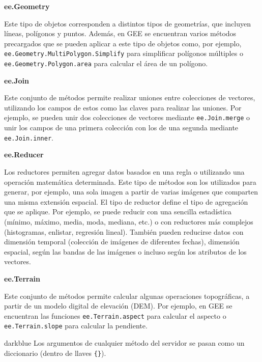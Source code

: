 \documentclass[
  12pt,
  letterpaper,
  twoside]{book}
\begin{document}
\textbf{ee.Geometry}

Este tipo de objetos corresponden a distintos tipos de geometrías, que incluyen líneas, polígonos y puntos. Además, en GEE se encuentran varios métodos precargados que se pueden aplicar a este tipo de objetos como, por ejemplo, \texttt{ee.Geometry.MultiPolygon.Simplify} para simplificar polígonos múltiples o \texttt{ee.Geometry.Polygon.area} para calcular el área de un polígono.

\textbf{ee.Join}

Este conjunto de métodos permite realizar uniones entre colecciones de vectores, utilizando los campos de estos como las claves para realizar las uniones. Por ejemplo, se pueden unir dos colecciones de vectores mediante \texttt{ee.Join.merge} o unir los campos de una primera colección con los de una segunda mediante \texttt{ee.Join.inner}.

\textbf{ee.Reducer}

Los reductores permiten agregar datos basados en una regla o utilizando una operación matemática determinada. Este tipo de métodos son los utilizados para generar, por ejemplo, una sola imagen a partir de varias imágenes que comparten una misma extensión espacial. El tipo de reductor define el tipo de agregación que se aplique. Por ejemplo, se puede reducir con una sencilla estadística (mínimo, máximo, media, moda, mediana, etc.) o con reductores más complejos (histogramas, enlistar, regresión lineal). También pueden reducirse datos con dimensión temporal (colección de imágenes de diferentes fechas), dimensión espacial, según las bandas de las imágenes o incluso según los atributos de los vectores.

\textbf{ee.Terrain}

Este conjunto de métodos permite calcular algunas operaciones topográficas, a partir de un modelo digital de elevación (DEM). Por ejemplo, en GEE se encuentran las funciones \texttt{ee.Terrain.aspect} para calcular el aspecto o \texttt{ee.Terrain.slope} para calcular la pendiente.

\begin{bluebox2}

\begin{awesomeblock}{5pt}{\faLightbulb}{darkblue}
Los argumentos de cualquier método del servidor se pasan como un diccionario (dentro de llaves \texttt{\{\}}).

\end{awesomeblock}

\end{bluebox2}
\end{document}
